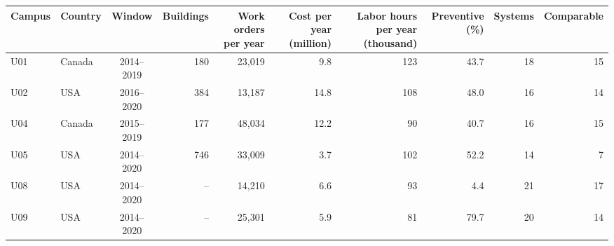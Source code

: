 \begin{tabular}{llcrrrrrrr}
\toprule
Campus & Country & Window & Buildings & Work orders per year & Cost per year (million) & Labor hours per year (thousand) & Preventive (\%) & Systems & Comparable \\
\midrule
U01 & Canada & 2014--2019 & 180 & 23,019 & 9.8 & 123 & 43.7 & 18 & 15 \\
U02 & USA & 2016--2020 & 384 & 13,187 & 14.8 & 108 & 48.0 & 16 & 14 \\
U04 & Canada & 2015--2019 & 177 & 48,034 & 12.2 & 90 & 40.7 & 16 & 15 \\
U05 & USA & 2014--2020 & 746 & 33,009 & 3.7 & 102 & 52.2 & 14 & 7 \\
U08 & USA & 2014--2020 & -- & 14,210 & 6.6 & 93 & 4.4 & 21 & 17 \\
U09 & USA & 2014--2020 & -- & 25,301 & 5.9 & 81 & 79.7 & 20 & 14 \\
\bottomrule
\end{tabular}
